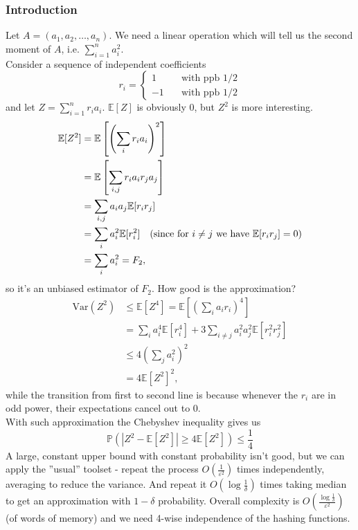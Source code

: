 \documentclass[11pt]{article}
\newcommand{\var}{\mathrm{Var}}
\begin{document}
\subsubsection{Introduction}
Let $A = (a_1, a_2, \dots, a_n)$. We need a linear operation which will tell us the second moment of $A$, i.e. $\sum_{i=1}^n a_i^2$. \\
Consider a sequence of independent coefficients $$r_i = \begin{cases}1 \quad&\textrm{with ppb }1/2\\ -1\quad&\textrm{with ppb }1/2 \end{cases}$$ 
and let $Z = \sum_{i=1}^n r_i a_i$. $\mathbb{E}[Z]$ is obviously 0, but $Z^2$ is more interesting.
\begin{align*}
    \mathbb{E}[Z^2] &= \mathbb{E}\left[ \left( \sum_i r_i a_i \right)^2 \right] \\
    &= \mathbb{E}\left[\sum_{i, j} r_i a_i r_j a_j \right] \\
    &= \sum_{i, j}a_i a_j \mathbb{E}[r_i r_j] \\
    &= \sum_i a_i^2 \mathbb{E}[r_i^2] \text{\quad (since for $i \neq j$ we have $\mathbb{E}[r_i r_j] = 0$)} \\
    &= \sum_i a_i^2 = F_2,
\end{align*}
so it's an unbiased estimator of $F_2$. How good is the approximation?
\begin{align*}
    \var(Z^2) &\leq \mathbb{E}[Z^4] = \mathbb{E}\left[ \left( \sum_i a_i r_i \right)^4 \right] \\
    &= \sum_i a_i^4 \mathbb{E}[r_i^4] + 3 \sum_{i \neq j} a_i^2 a_j^2 \mathbb{E}[r_i^2 r_j^2] \\
    &\leq 4 \left( \sum_j a_i^2 \right)^2 \\
    &= 4 \mathbb{E}[Z^2]^2,
\end{align*}
while the transition from first to second line is because whenever the $r_i$ are in odd power, their expectations cancel out to 0. \\
With such approximation the Chebyshev inequality gives us
$$ \mathbb{P} \left( \left|Z^2 - \mathbb{E}[Z^2] \right| \geq 4\mathbb{E}[Z^2] \right) \leq \frac{1}{4}$$
A large, constant upper bound with constant probability isn't good, but we can apply the ''usual'' toolset - repeat the process $O\left( \frac{1}{\varepsilon^2} \right)$ times independently, averaging to reduce the variance. And repeat it $O\left( \log \frac{1}{\delta} \right)$ times taking median to get an approximation with $1 - \delta$ probability. Overall complexity is $O \left( \frac{\log \frac{1}{\delta}}{\varepsilon^2}\right)$ (of words of memory) and we need 4-wise independence of the hashing functions.
\end{document}
